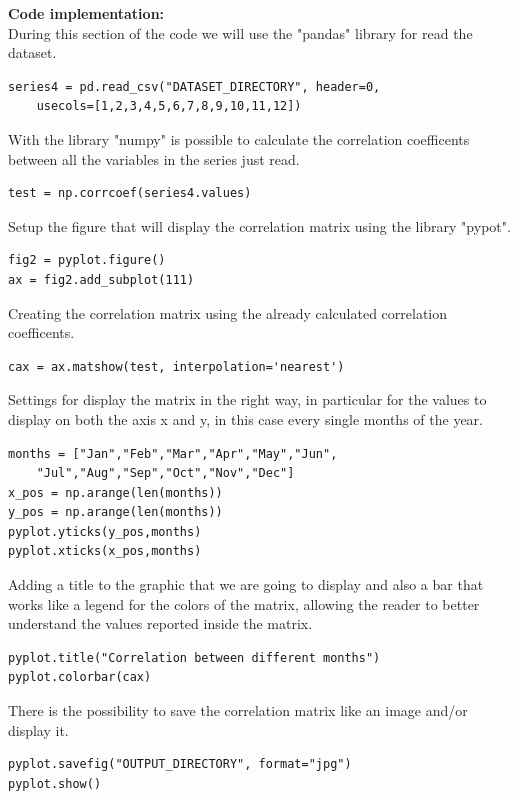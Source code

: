 \textbf{Code implementation:}\\
During this section of the code we will use the "pandas" library for read the dataset.
\begin{lstlisting}
series4 = pd.read_csv("DATASET_DIRECTORY", header=0, 
	usecols=[1,2,3,4,5,6,7,8,9,10,11,12])
\end{lstlisting}

With the library "numpy" is possible to calculate the correlation coefficents between all the variables in the series just read.
\begin{lstlisting}
test = np.corrcoef(series4.values)
\end{lstlisting}

Setup the figure that will display the correlation matrix using the library "pypot".
\begin{lstlisting}
fig2 = pyplot.figure()
ax = fig2.add_subplot(111)
\end{lstlisting}

Creating the correlation matrix using the already calculated correlation coefficents.
\begin{lstlisting}
cax = ax.matshow(test, interpolation='nearest')
\end{lstlisting}

Settings for display the matrix in the right way, in particular for the values to display on both the axis x and y, in this case every single months of the year.
\begin{lstlisting}
months = ["Jan","Feb","Mar","Apr","May","Jun",
	"Jul","Aug","Sep","Oct","Nov","Dec"]
x_pos = np.arange(len(months))
y_pos = np.arange(len(months))
pyplot.yticks(y_pos,months)
pyplot.xticks(x_pos,months)
\end{lstlisting}
\newpage
Adding a title to the graphic that we are going to display and also a bar that works like a legend for the colors of the matrix, allowing the reader to better understand the values reported inside the matrix.
\begin{lstlisting}
pyplot.title("Correlation between different months")
pyplot.colorbar(cax)
\end{lstlisting}

There is the possibility to save the correlation matrix like an image and/or display it.
\begin{lstlisting}
pyplot.savefig("OUTPUT_DIRECTORY", format="jpg")
pyplot.show()
\end{lstlisting}

